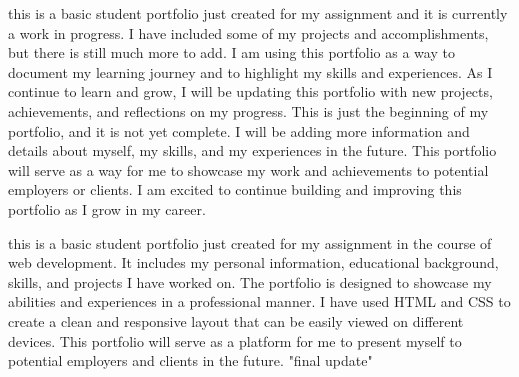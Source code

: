 
this is a basic student portfolio just created for my assignment and it is currently a work in progress. I have included some of my projects and accomplishments, but there is still much more to add. I am using this portfolio as a way to document my learning journey and to highlight my skills and experiences. As I continue to learn and grow, I will be updating this portfolio with new projects, achievements, and reflections on my progress. This is just the beginning of my portfolio,
and it is not yet complete. I will be adding more information and details about myself, my skills, and my experiences in the future. This portfolio will serve as a way for me to showcase my work and achievements to potential employers or clients. I am excited to continue building and improving this portfolio as I grow in my career.

this is a basic student portfolio just created for my assignment in the course of web development. It includes my personal information, educational background, skills, and projects I have worked on. The portfolio is designed to showcase my abilities and experiences in a professional manner. I have used HTML and CSS to create a clean and responsive layout that can be easily viewed on different devices. This portfolio will serve as a platform for me to present myself to potential employers and clients in the future.
"final update"